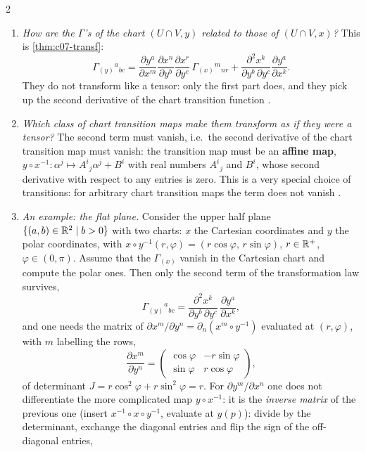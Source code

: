 \begin{paracol}{2}
\begin{enumerate}
  \item \emph{How are the $\Gamma$'s of the chart $(U\cap V,y)$ related to those of $(U\cap V,x)$?} This is \cref{thm:c07-transf}:
        \[
          \Gamma_{(y)}{}^a{}_{bc}=\frac{\partial y^a}{\partial x^m}\frac{\partial x^n}{\partial y^b}\frac{\partial x^r}{\partial y^c}\,\Gamma_{(x)}{}^m{}_{nr}+\frac{\partial^2x^k}{\partial y^b\,\partial y^c}\frac{\partial y^a}{\partial x^k}.
        \]
        They do not transform like a tensor: only the first part does, and they pick up the second derivative of the chart transition function .
  \item \emph{Which class of chart transition maps make them transform as if they were a tensor?} The second term must vanish, i.e.\ the second derivative of the chart transition map must vanish: the transition map must be an \textbf{affine map}, $y\circ x^{-1}\colon\alpha^j\mapsto A^i{}_j\alpha^j+B^i$ with real numbers $A^i{}_j$ and $B^i$, whose second derivative with respect to any entries is zero. This is a very special choice of transitions: for arbitrary chart transition maps the term does not vanish .
  \item \emph{An example: the flat plane.} Consider the upper half plane $\{(a,b)\in\mathbb{R}^2\mid b>0\}$ with two charts: $x$ the Cartesian coordinates and $y$ the polar coordinates, with $x\circ y^{-1}(r,\varphi)=(r\cos\varphi,\,r\sin\varphi)$, $r\in\mathbb{R}^+$, $\varphi\in(0,\pi)$. Assume that the $\Gamma_{(x)}$ vanish in the Cartesian chart and compute the polar ones. Then only the second term of the transformation law survives,
        \[
          \Gamma_{(y)}{}^a{}_{bc}=\frac{\partial^2x^k}{\partial y^b\,\partial y^c}\,\frac{\partial y^a}{\partial x^k},
        \]
        and one needs the matrix of $\partial x^m/\partial y^n=\partial_n(x^m\circ y^{-1})$ evaluated at $(r,\varphi)$, with $m$ labelling the rows,
        \[
          \frac{\partial x^m}{\partial y^n}=\begin{pmatrix}\cos\varphi&-r\sin\varphi\\ \sin\varphi&r\cos\varphi\end{pmatrix},
        \]
        of determinant $J=r\cos^2\varphi+r\sin^2\varphi=r$. For $\partial y^m/\partial x^n$ one does not differentiate the more complicated map $y\circ x^{-1}$: it is the \emph{inverse matrix} of the previous one (insert $x^{-1}\circ x\circ y^{-1}$, evaluate at $y(p)$): divide by the determinant, exchange the diagonal entries and flip the sign of the off-diagonal entries,

\end{enumerate}
\end{paracol}
